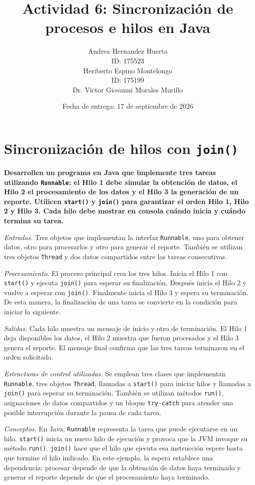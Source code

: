 \documentclass[12pt,oneside]{template/liverpoolthesis}
\title{Actividad 6: Sincronización de procesos e hilos en Java}
\author{%
  Andrea Hernandez Huerta\\
  ID: 175523\\[1em]
  Heriberto Espino Montelongo\\
  ID: 175199\\[1em]
  \text{Profesor:} Dr. Victor Giovanni Morales Murillo}
\date{Fecha de entrega: 17 de septiembre de 2026}
\begin{document}
\frontmatter
\maketitle
\tableofcontents
\listoffigures

\mainmatter

\chapter{Sincronización de hilos con \texttt{join()}}

\textbf{Desarrollen un programa en Java que implemente tres tareas utilizando
\texttt{Runnable}: el Hilo 1 debe simular la obtención de datos, el Hilo 2 el
procesamiento de los datos y el Hilo 3 la generación de un reporte. Utilicen
\texttt{start()} y \texttt{join()} para garantizar el orden Hilo 1, Hilo 2 y
Hilo 3. Cada hilo debe mostrar en consola cuándo inicia y cuándo termina su
tarea.}

\emph{Entradas.} Tres objetos que implementan la interfaz \texttt{Runnable},
uno para obtener datos, otro para procesarlos y otro para generar el reporte.
También se utilizan tres objetos \texttt{Thread} y dos datos compartidos entre
las tareas consecutivas.

\emph{Procesamiento.} El proceso principal crea los tres hilos. Inicia el
Hilo 1 con \texttt{start()} y ejecuta \texttt{join()} para esperar su
finalización. Después inicia el Hilo 2 y vuelve a esperar con \texttt{join()}.
Finalmente inicia el Hilo 3 y espera su terminación. De esta manera, la
finalización de una tarea se convierte en la condición para iniciar la
siguiente.

\emph{Salidas.} Cada hilo muestra un mensaje de inicio y otro de terminación.
El Hilo 1 deja disponibles los datos, el Hilo 2 muestra que fueron procesados
y el Hilo 3 genera el reporte. El mensaje final confirma que las tres tareas
terminaron en el orden solicitado.

\emph{Estructuras de control utilizadas.} Se emplean tres clases que
implementan \texttt{Runnable}, tres objetos \texttt{Thread}, llamadas a
\texttt{start()} para iniciar hilos y llamadas a \texttt{join()} para esperar
su terminación. También se utilizan métodos \texttt{run()}, asignaciones de
datos compartidos y un bloque \texttt{try-catch} para atender una posible
interrupción durante la pausa de cada tarea.

\emph{Conceptos.} En Java, \texttt{Runnable} representa la tarea que puede
ejecutarse en un hilo. \texttt{start()} inicia un nuevo hilo de ejecución y
provoca que la JVM invoque su método \texttt{run()}. \texttt{join()} hace que
el hilo que ejecuta esa instrucción espere hasta que termine el hilo indicado.
En este ejemplo, la espera establece una dependencia: procesar depende de que
la obtención de datos haya terminado y generar el reporte depende de que el
procesamiento haya terminado.
\end{document}
